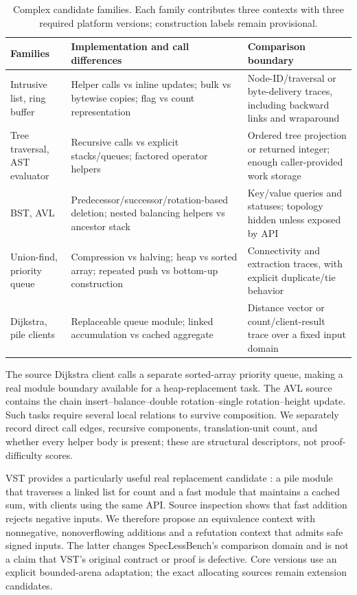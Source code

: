 \documentclass{article}
\begin{document}
\begin{table}[t]
\centering
\small
\caption{Complex candidate families. Each family contributes three contexts with three required platform versions; construction labels remain provisional.}
\label{tab:complex}
\begin{tabular}{p{}p{}p{}}
\toprule
Families & Implementation and call differences & Comparison boundary \\
\midrule
Intrusive list, ring buffer & Helper calls vs inline updates; bulk vs bytewise copies; flag vs count representation & Node-ID/traversal or byte-delivery traces, including backward links and wraparound \\
Tree traversal, AST evaluator & Recursive calls vs explicit stacks/queues; factored operator helpers & Ordered tree projection or returned integer; enough caller-provided work storage \\
BST, AVL & Predecessor/successor/rotation-based deletion; nested balancing helpers vs ancestor stack & Key/value queries and statuses; topology hidden unless exposed by API \\
Union-find, priority queue & Compression vs halving; heap vs sorted array; repeated push vs bottom-up construction & Connectivity and extraction traces, with explicit duplicate/tie behavior \\
Dijkstra, pile clients & Replaceable queue module; linked accumulation vs cached aggregate & Distance vector or count/client-result trace over a fixed input domain \\
\bottomrule
\end{tabular}
\end{table}

The source Dijkstra client calls a separate sorted-array priority queue, making a real module boundary available for a heap-replacement task. The AVL source contains the chain insert--balance--double rotation--single rotation--height update. Such tasks require several local relations to survive composition. We separately record direct call edges, recursive components, translation-unit count, and whether every helper body is present; these are structural descriptors, not proof-difficulty scores.

VST provides a particularly useful real replacement candidate \citep{beringer2019abstraction,vst2026source}: a pile module that traverses a linked list for count and a fast module that maintains a cached sum, with clients using the same API. Source inspection shows that fast addition rejects negative inputs. We therefore propose an equivalence context with nonnegative, nonoverflowing additions and a refutation context that admits safe signed inputs. The latter changes SpecLessBench's comparison domain and is not a claim that VST's original contract or proof is defective. Core versions use an explicit bounded-arena adaptation; the exact allocating sources remain extension candidates.
\end{document}
